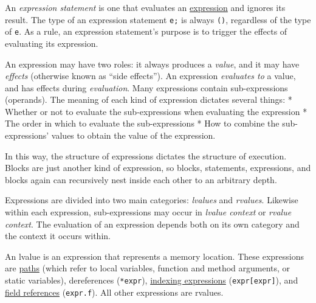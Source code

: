 \documentclass[]{article}
\begin{document}

An \emph{expression statement} is one that evaluates an
\hyperref[expressions]{expression} and ignores its result. The type of
an expression statement \texttt{e;} is always \texttt{()}, regardless of
the type of \texttt{e}. As a rule, an expression statement's purpose is
to trigger the effects of evaluating its expression.


An expression may have two roles: it always produces a \emph{value}, and
it may have \emph{effects} (otherwise known as ``side effects''). An
expression \emph{evaluates to} a value, and has effects during
\emph{evaluation}. Many expressions contain sub-expressions (operands).
The meaning of each kind of expression dictates several things: *
Whether or not to evaluate the sub-expressions when evaluating the
expression * The order in which to evaluate the sub-expressions * How to
combine the sub-expressions' values to obtain the value of the
expression.

In this way, the structure of expressions dictates the structure of
execution. Blocks are just another kind of expression, so blocks,
statements, expressions, and blocks again can recursively nest inside
each other to an arbitrary depth.


Expressions are divided into two main categories: \emph{lvalues} and
\emph{rvalues}. Likewise within each expression, sub-expressions may
occur in \emph{lvalue context} or \emph{rvalue context}. The evaluation
of an expression depends both on its own category and the context it
occurs within.

An lvalue is an expression that represents a memory location. These
expressions are \hyperref[path-expressions]{paths} (which refer to local
variables, function and method arguments, or static variables),
dereferences (\texttt{*expr}), \hyperref[index-expressions]{indexing
expressions} (\texttt{expr{[}expr{]}}), and
\hyperref[field-expressions]{field references} (\texttt{expr.f}). All
other expressions are rvalues.
\end{document}
